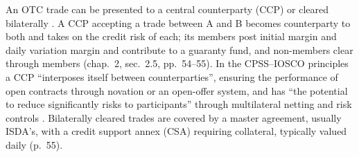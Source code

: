 \begin{qfmechanism}\label{mech:otc-clearing-collateral}
 An OTC trade can be presented to a central counterparty (CCP) or cleared bilaterally \citep[chap.~1, ``Introduction'', sec.~1.2, p.~25]{s7-hulloptions}. A CCP accepting a trade between A and B becomes counterparty to both and takes on the credit risk of each; its members post initial margin and daily variation margin and contribute to a guaranty fund, and non-members clear through members (chap.~2, sec.~2.5, pp.~54--55). In the CPSS--IOSCO principles a CCP ``interposes itself between counterparties'', ensuring the performance of open contracts through novation or an open-offer system, and has ``the potential to reduce significantly risks to participants'' through multilateral netting and risk controls \citep[para.~1.13, p.~9]{exp-pfmi}. Bilaterally cleared trades are covered by a master agreement, usually ISDA's, with a credit support annex (CSA) requiring collateral, typically valued daily (p.~55).


\end{qfmechanism}
